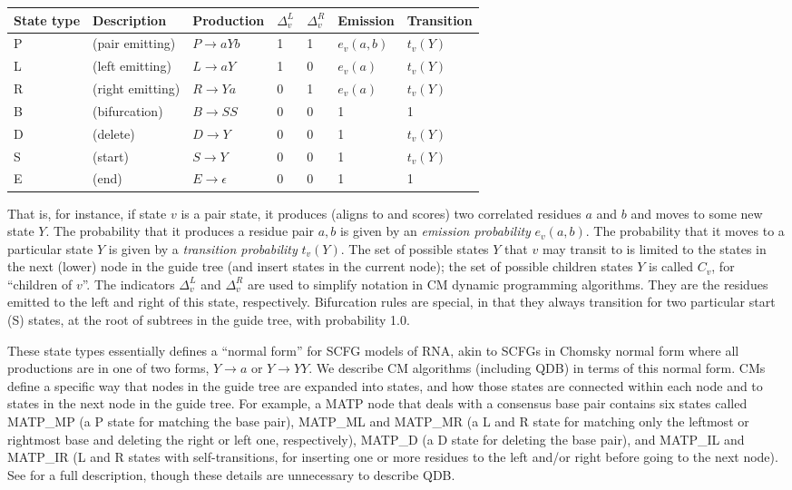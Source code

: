 \documentclass[11pt]{article}
\begin{document}
\vspace{0.5em}
\begin{tabular}{lllllll}
State type & Description &  Production   & $\Delta_v^{L}$ & $\Delta_v^{R}$ & Emission & Transition\\ \hline
P & (pair emitting)   & $P \rightarrow a Y b$ & 1 & 1 & $e_v(a,b)$ & $t_v(Y)$  \\
L & (left emitting)   & $L \rightarrow a Y$   & 1 & 0 & $e_v(a)$   & $t_v(Y)$  \\
R & (right emitting)  & $R \rightarrow Y a$   & 0 & 1 & $e_v(a)$   & $t_v(Y)$  \\
B & (bifurcation)     & $B \rightarrow S S$   & 0 & 0 & 1     &     1     \\
D & (delete)          & $D \rightarrow Y$     & 0 & 0 & 1     &   $t_v(Y)$  \\
S & (start)           & $S \rightarrow Y$     & 0 & 0 &    1     & $t_v(Y)$  \\
E & (end)             & $E \rightarrow \epsilon$ & 0 & 0 & 1     &     1     \\
\end{tabular}
\vspace{0.5em}

That is, for instance, if state $v$ is a pair state, it produces
(aligns to and scores) two correlated residues $a$ and $b$ and moves
to some new state $Y$.  The probability that it produces a residue
pair $a,b$ is given by an \emph{emission probability} $e_v(a,b)$.  The
probability that it moves to a particular state $Y$ is given by a
\emph{transition probability} $t_v(Y)$.  The set of possible states
$Y$ that $v$ may transit to is limited to the states in the next
(lower) node in the guide tree (and insert states in the current
node); the set of possible children states $Y$ is called $C_v$, for
``children of $v$''. The indicators $\Delta_v^{L}$ and $\Delta_v^{R}$
are used to simplify notation in CM dynamic programming algorithms.
They are the residues emitted to the left and right of this state,
respectively. Bifurcation rules are special, in that they always
transition for two particular start (S) states, at the root of
subtrees in the guide tree, with probability 1.0.

These state types essentially defines a ``normal form'' for SCFG
models of RNA, akin to SCFGs in Chomsky normal form where all
productions are in one of two forms, $Y \rightarrow a$ or $Y
\rightarrow YY$. We describe CM algorithms (including QDB) in terms of
this normal form. CMs define a specific way that nodes in the guide
tree are expanded into states, and how those states are connected
within each node and to states in the next node in the guide tree. For
example, a MATP node that deals with a consensus base pair contains
six states called MATP\_MP (a P state for matching the base pair),
MATP\_ML and MATP\_MR (a L and R state for matching only the leftmost
or rightmost base and deleting the right or left one, respectively),
MATP\_D (a D state for deleting the base pair), and MATP\_IL and
MATP\_IR (L and R states with self-transitions, for inserting one or
more residues to the left and/or right before going to the next
node). See \cite{Eddy02b, infguide03} for a full description, though
these details are unnecessary to describe QDB.
\end{document}
